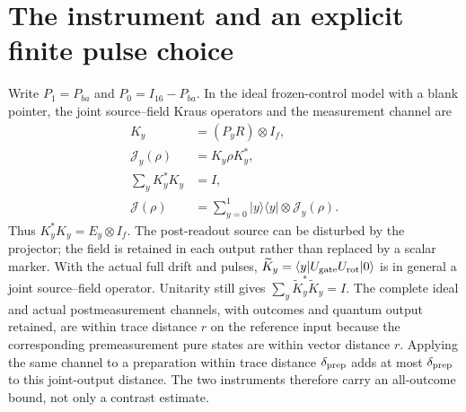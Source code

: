 \section{The instrument and an explicit finite pulse choice}
\label{sec:chvisd-instrument}

Write $P_1=P_{ba}$ and $P_0=I_{16}-P_{ba}$. In the ideal frozen-control
model with a blank pointer, the joint source--field Kraus operators and
the measurement channel are
\begin{equation}
 \begin{aligned}
 K_y&=(P_yR)\otimes I_f,\\
 \mathcal J_y(\rho)&=K_y\rho K_y^*,\\
 \sum_yK_y^*K_y&=I,\\
 \mathcal J(\rho)&=\sum_{y=0}^1|y\rangle\langle y|
                         \otimes\mathcal J_y(\rho).
 \end{aligned}
\label{eq:chvisd-ideal-instrument}
\end{equation}
Thus $K_y^*K_y=E_y\otimes I_f$. The post-readout source can be disturbed
by the projector; the field is retained in each output rather than
replaced by a scalar marker. With the actual full drift and pulses,
$\widetilde K_y=\langle y|U_{\rm gate}U_{\rm rot}|0\rangle$
is in general a joint source--field operator. Unitarity still gives
$\sum_y\widetilde K_y^*\widetilde K_y=I$.
The complete ideal and actual postmeasurement channels, with outcomes
and quantum output retained, are within trace distance $r$ on the
reference input because the corresponding premeasurement pure states
are within vector distance $r$. Applying the same channel to a
preparation within trace distance $\delta_{\rm prep}$ adds at most
$\delta_{\rm prep}$ to this joint-output distance. The two instruments
therefore carry an all-outcome bound, not only a contrast estimate.

